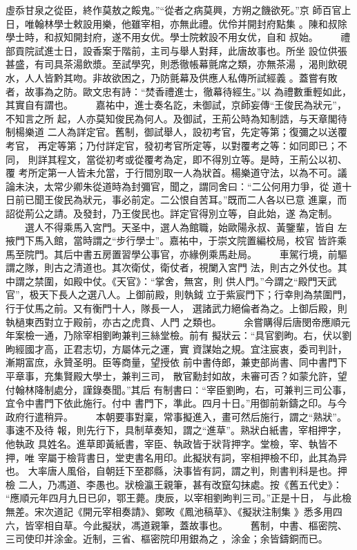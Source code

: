 \documentclass{ctexart}
\begin{document}
虛忝甘泉之從臣，終作莫敖之餒鬼。''``從者之病莫興，方朔之饑欲死。''京 師百官上日，唯翰林學士敕設用樂，他雖宰相，亦無此禮。优伶并開封府點集 。陳和叔除學士時，和叔知開封府，遂不用女优。學士院敕設不用女优，自和 叔始。 　　禮部貢院試進士日，設香案于階前，主司与舉人對拜，此唐故事也。所坐 設位供張甚盛，有司具茶湯飲漿。至試學究，則悉徹帳幕氈席之類，亦無茶湯 ，渴則飲硯水，人人皆黔其吻。非故欲困之，乃防氈幕及供應人私傳所試經義 。蓋嘗有敗者，故事為之防。歐文忠有詩：``焚香禮進士，徹幕待經生。''以 為禮數重輕如此，其實自有謂也。 　　嘉祐中，進士奏名訖，未御試，京師妄傳``王俊民為狀元''，不知言之所 起，人亦莫知俊民為何人。及御試，王荊公時為知制誥，与天章閣待制楊樂道 二人為詳定官。舊制，御試舉人，設初考官，先定等第；復彌之以送覆考官， 再定等第；乃付詳定官，發初考官所定等，以對覆考之等：如同即已；不同， 則詳其程文，當從初考或從覆考為定，即不得別立等。是時，王荊公以初、覆 考所定第一人皆未允當，于行間別取一人為狀首。楊樂道守法，以為不可。議 論未決，太常少卿朱從道時為封彌官，聞之，謂同舍曰：``二公何用力爭，從 道十日前已聞王俊民為狀元，事必前定。二公恨自苦耳。''既而二人各以已意 進稟，而詔從荊公之請。及發封，乃王俊民也。詳定官得別立等，自此始，遂 為定制。 　　選人不得乘馬入宮門。天圣中，選人為館職，始歐陽永叔、黃鑒輩，皆自 左掖門下馬入館，當時謂之``步行學士''。嘉祐中，于崇文院置編校局，校官 皆許乘馬至院門。其后中書五房置習學公事官，亦緣例乘馬赴局。 　　車駕行境，前驅謂之隊，則古之清道也。其次衛仗，衛仗者，視闌入宮門 法，則古之外仗也。其中謂之禁圍，如殿中仗。《天官》：``掌舍，無宮，則 供人門。''今謂之``殿門天武官''，极天下長人之選八人。上御前殿，則執鉞 立于紫宸門下；行幸則為禁圍門，行于仗馬之前。又有衡門十人，隊長一人， 選諸武力絕倫者為之。上御后殿，則執檛東西對立于殿前，亦古之虎賁、人門 之類也。 　　余嘗購得后唐閔帝應順元年案檢一通，乃除宰相劉昫兼判三絲堂檢。前有 擬狀云：``具官劉昫。右，伏以劉昫經國才高，正君志切，方屬体元之運，實 資謀始之規。宜注宸衷，委司判計，漸期富庶，永贊圣明。臣等商量，望授依 前中書侍郎，兼吏部尚書、同中書門下平章事，充集賢殿大學士，兼判三司， 散官勳封如故，未審可否？如蒙允許，望付翰林降制處分，謹錄奏聞。''其后 有制書曰：``宰臣劉昫，右，可兼判三司公事，宜令中書門下依此施行。付中 書門下，準此。四月十日。''用御前新鑄之印。与今政府行遣稍异。 　　本朝要事對稟，常事擬進入，畫可然后施行，謂之``熟狀''。事速不及待 報，則先行下，具制草奏知，謂之``進草''。熟狀白紙書，宰相押字，他執政 具姓名。進草即黃紙書，宰臣、執政皆于狀背押字。堂檢，宰、執皆不押，唯 宰屬于檢背書日，堂吏書名用印。此擬狀有詞，宰相押檢不印，此其為异也。 大率唐人風俗，自朝廷下至郡縣，決事皆有詞，謂之判，則書判科是也。押檢 二人，乃馮道、李愚也。狀檢瀛王親筆，甚有改竄勾抹處。按《舊五代史》： ``應順元年四月九日已卯，鄂王薨。庚辰，以宰相劉昫判三司。''正是十日， 与此檢無差。宋次道記《開元宰相奏請》、鄭畋《鳳池稿草》、《擬狀注制集 》悉多用四六，皆宰相自草。今此擬狀，馮道親筆，蓋故事也。 　　舊制，中書、樞密院、三司使印并涂金。近制，三省、樞密院印用銀為之 ，涂金；余皆鑄銅而已。
\clearpage
\end{document}
